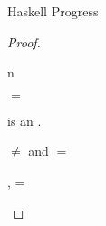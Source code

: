 \begin{theorem}{Haskell Progress}
\begin{proof}
\begin{case}{\pspnull}
\end{case}


\newcommand{\psif}{\expif{\first{\varexph}}{\second{\varexph}}{\third{\varexph}}\xspace}
\renewcommand{\x}{\expnum{\varnum}\xspace}

\begin{case}{\psif}

\pshypby
{\first{\varexph}}
{\fourth{\varexph}}
\psvalifeqh
{\first{\varexph}}
{\tynum}
{\x}
\psred
{}
{\second{\varexph}}
\psrednote
{\expif{\x}{\second{\varexph}}{\third{\varexph}}}
{\third{\varexph}}
{n }
\pssub
{\first{\varexph}}
{\fourth{\varexph}}
{\psif}
{\expif{\fourth{\varexph}}{\second{\varexph}}{\third{\varexph}}}
\pserr
{\first{\varexph}}
{\psif}

\end{case}


\newcommand{\pswrongs}{\expwrongs{\vartyh}{\varstr}\xspace}

\begin{case}{\pswrongs}

\psred
{\pswrongs}
{\emph{\experr{\varstr}}}

\end{case}


\newcommand{\pshm}{\exphm{\first{\vartyh}}{\first{\vartym}}{\first{\varexpm}}}

\begin{case}{\pshm}

\pshypby
{\first{\varexpm}}
{\second{\varexpm}}
\pscasestwo
{\first{\varexpm}}
{\first{\vartyh}}
{\first{\vartym}}
{\pshm}


\begin{subcase}{\first{\vartyh} $=$ \tylump}

\exphm{\tylump}{\first{\vartym}}{\first{\varexpm}} is an \prouv.

\end{subcase}


\begin{subcase}{\first{\vartyh} $\neq$ \tylump and \first{\vartym} $=$ \tylump}

\psvalinh
{\first{\varexpm}}
{\tylump}
{\expmh{\tylump}{\second{\vartyh}}{\varexph}, \expms{\cslump}{\varvalfs}}
\psrednote
{\exphm{\first{\vartyh}}{\tylump}{(\expmh{\tylump}{\second{\vartyh}}{\varexph})}}
{\varexph}
{\first{\vartyh} = \second{\vartyh}}
\psrednote
{\exphm{\first{\vartyh}}{\tylump}{(\expmh{\tylump}{\second{\vartyh}}{\varexph})}}
{\varexph}
{\first{\vartyh} \neq \second{\vartyh}}
\psred
{\exphm{\first{\vartyh}}{\tylump}{(\expms{\cslump}{\varvalfs})}}
{\expwrongs{\first{\vartyh}}{\errvalue}}


\end{subcase}
\end{case}
\end{proof}
\end{theorem}

